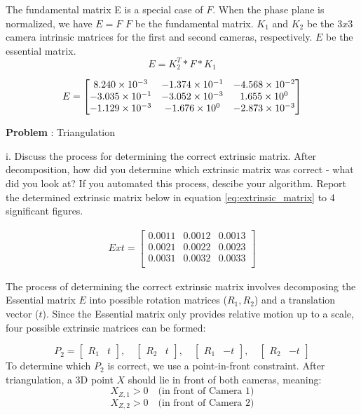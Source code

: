 \documentclass[onecolumn,10pt]{article}
\begin{document}
The fundamental matrix E is a special case of $F$. When the phase plane is normalized, we have $E=F$
$F$ be the fundamental matrix.
$K_1$ and $K_2$ be the $3x3$ camera intrinsic matrices for the first and second cameras, respectively.
$E$ be the essential matrix.
$$E = K_2^T * F * K_1$$

\begin{align}
E = \begin{bmatrix}
\multicolumn{1}{c}{8.240 \times 10^{-3}} & \multicolumn{1}{c}{-1.374 \times 10^{-1}} & \multicolumn{1}{c}{-4.568 \times 10^{-2}} \\
\multicolumn{1}{c}{-3.035 \times 10^{-1}} & \multicolumn{1}{c}{-3.052 \times 10^{-3}} & \multicolumn{1}{c}{1.655 \times 10^{0}} \\
\multicolumn{1}{c}{-1.129 \times 10^{-3}}  & \multicolumn{1}{c}{-1.676 \times 10^{0}} & \multicolumn{1}{c}{-2.873 \times 10^{-3}} \\
\end{bmatrix}
\label{eq:essential_matrix}
\end{align}

\addtocounter{problemnumber}{1}
\noindent\textbf{Problem }:  Triangulation

i. Discuss the process for determining the correct extrinsic matrix. After decomposition, how did you determine which extrinsic matrix was correct - what did you look at? If you automated this process, descibe your algorithm. Report the determined extrinsic matrix below in equation \ref{eq:extrinsic_matrix} to 4 significant figures.

\begin{align}
Ext=\begin{bmatrix}
0.0011 & 0.0012 & 0.0013 \\
0.0021 & 0.0022 & 0.0023 \\
0.0031 & 0.0032 & 0.0033 \\
\end{bmatrix}
\label{eq:extrinsic_matrix}
\end{align}


The process of determining the correct extrinsic matrix involves decomposing the Essential matrix \(E\) into possible rotation matrices (\(R_1, R_2\)) and a translation vector (\(t\)). Since the Essential matrix only provides relative motion up to a scale, four possible extrinsic matrices can be formed:

\[
P_2 =
\begin{bmatrix}
R_1 & t
\end{bmatrix}, \quad
\begin{bmatrix}
R_2 & t
\end{bmatrix}, \quad
\begin{bmatrix}
R_1 & -t
\end{bmatrix}, \quad
\begin{bmatrix}
R_2 & -t
\end{bmatrix}
\]
To determine which \(P_2\) is correct, we use a point-in-front constraint. After triangulation, a 3D point \(X\) should lie in front of both cameras, meaning:
\[
X_{Z,1} > 0 \quad \text{(in front of Camera 1)}
\]
\[
X_{Z,2} > 0 \quad \text{(in front of Camera 2)}
\]
\end{document}
